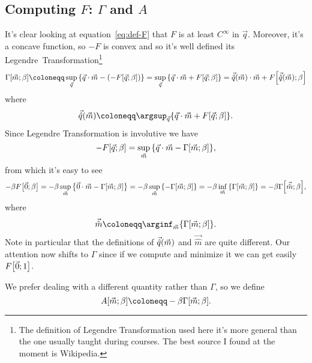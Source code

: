 \subsection{Computing \(F\): \(\Gamma\) and \(A\)}
It's clear looking at equation~\eqref{eq:def-F} that \(F\) is at least \(C^\infty\)
in \(\vec{q}\). Moreover, it's a concave function, so \(-F\) is convex and so it's well
defined its Legendre~Transformation\footnote{The definition of Legendre Transformation
  used here it's more general than the one usually taught during courses. The best
  source I found at the moment is Wikipedia.}
\begin{equation}
  \Gam{\vec{m}}{\beta} \coloneqq \sup_{\vec{q}}{\left\{\vec{q}\cdot\vec{m}
                            - \left(-\FEn{\vec{q}}{\beta}\right)\right\}}
                       = \sup_{\vec{q}}{\left\{\vec{q}\cdot\vec{m}
                            + \FEn{\vec{q}}{\beta}\right\}}
                       = \qhat{\vec{m}}\cdot\vec{m} + \FEn{\qhat{\vec{m}}}{\beta}
\end{equation}
where
\[
  \qhat{\vec{m}} \coloneqq
  \argsup_{\vec{q}}{\left\{\vec{q}\cdot\vec{m} + \FEn{\vec{q}}{\beta}\right\}}.
\]
Since Legendre Transformation is involutive we have
\[
  -F{\left[\vec{q};\beta\right]} = \sup_{\vec{m}}{\left\{\vec{q}\cdot\vec{m} - \Gamma{\left[\vec{m};\beta\right]}\right\}},
\]
from which it's easy to see
\begin{equation*}
  -\beta F{\left[\vec{0};\beta\right]} = -\beta \sup_{\vec{m}}{\left\{\vec{0}\cdot\vec{m} -
                                                             \Gamma{\left[\vec{m};\beta\right]}\right\}}
                              = -\beta \sup_{\vec{m}}{\left\{-\Gamma{\left[\vec{m};\beta\right]}\right\}}
                              = -\beta \inf_{\vec{m}}{\left\{\Gamma{\left[\vec{m};\beta\right]}\right\}}
                              = -\beta \Gamma{\left[\vec{\hat{m}};\beta\right]},
\end{equation*}
where 
\[
  \vec{\hat{m}} \coloneqq
  \arginf_{\vec{m}}{\left\{\Gam{\vec{m}}{\beta}\right\}}.
\]
Note in particular that the definitions of \(\vec{\hat{q}}{(\vec{m})}\) and \(\vec{\hat{m}}\) are quite
different. Our attention now shifts to \(\Gamma\) since if we compute and minimize it we
can get easily \(F{\left[\vec{0};1\right]}\).

We prefer dealing with a different quantity rather than \(\Gamma\), so we define
\[
  A{\left[\vec{m};\beta\right]} \coloneqq -\beta \Gam{\vec{m}}{\beta}.
\]


